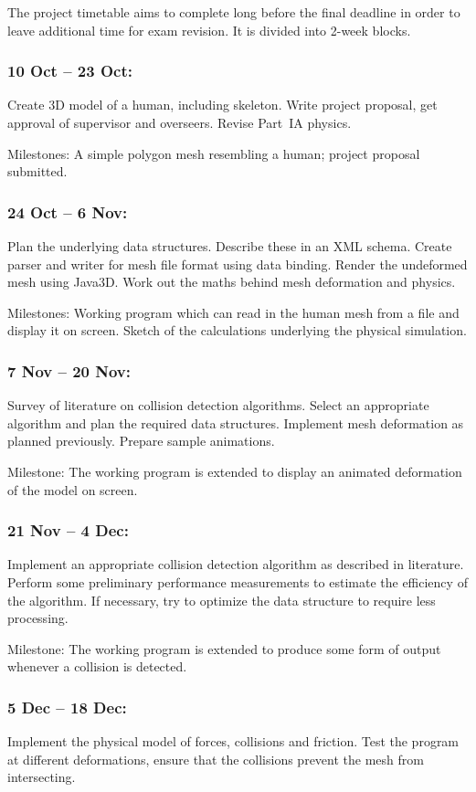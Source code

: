 The project timetable aims to complete long before the final deadline
in order to leave additional time for exam revision. It is divided
into 2-week blocks.

\subsubsection*{10 Oct -- 23 Oct:}
Create 3D model of a human, including skeleton. Write project proposal,
get approval of supervisor and overseers. Revise Part~IA physics.

Milestones: A simple polygon mesh resembling a human; project proposal
submitted.

\subsubsection*{24 Oct -- 6 Nov:}
Plan the underlying data structures. Describe these in an XML schema.
Create parser and writer for mesh file format using data binding.
Render the undeformed mesh using Java3D. Work out the maths behind
mesh deformation and physics.

Milestones: Working program which can read in the human mesh from a
file and display it on screen. Sketch of the calculations underlying
the physical simulation.

\subsubsection*{7 Nov -- 20 Nov:}
Survey of literature on collision detection algorithms. Select an
appropriate algorithm and plan the required data structures.
Implement mesh deformation as planned previously. Prepare sample
animations.

Milestone: The working program is extended to display an animated
deformation of the model on screen.

\subsubsection*{21 Nov -- 4 Dec:}
Implement an appropriate collision detection algorithm as described
in literature. Perform some preliminary performance measurements to
estimate the efficiency of the algorithm. If necessary, try to
optimize the data structure to require less processing.

Milestone: The working program is extended to produce some form of
output whenever a collision is detected.

\subsubsection*{5 Dec -- 18 Dec:}
Implement the physical model of forces, collisions and friction. Test
the program at different deformations, ensure that the collisions
prevent the mesh from intersecting.

